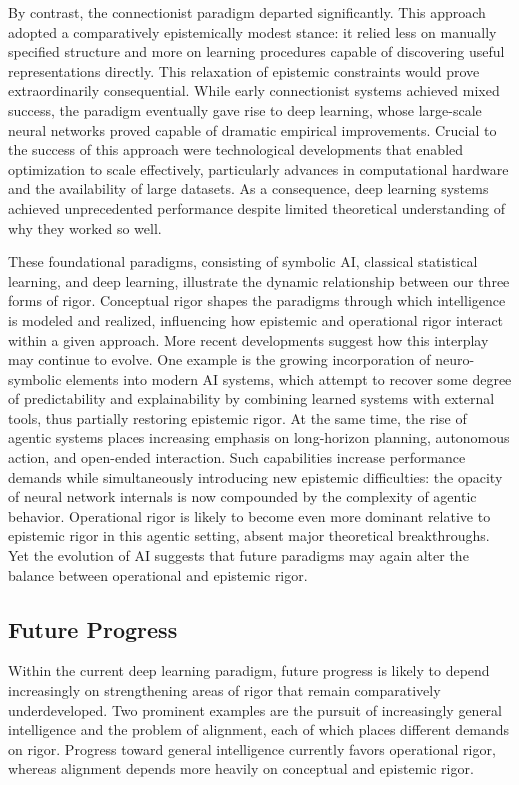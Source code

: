 \documentclass{article}
\begin{document}
By contrast, the connectionist paradigm departed significantly.
This approach adopted a comparatively epistemically modest stance: it relied less on manually specified structure and more on learning procedures capable of discovering useful representations directly.
This relaxation of epistemic constraints would prove extraordinarily consequential. While early connectionist systems achieved mixed success, the paradigm eventually gave rise to deep learning, whose large-scale neural networks proved capable of dramatic empirical improvements.
Crucial to the success of this approach were technological developments that enabled optimization to scale effectively, particularly advances in computational hardware and the availability of large datasets.
As a consequence, deep learning systems achieved unprecedented performance despite limited theoretical understanding of why they worked so well.

These foundational paradigms, consisting of symbolic AI, classical statistical learning, and deep learning, illustrate the dynamic relationship between our three forms of rigor.
Conceptual rigor shapes the paradigms through which intelligence is modeled and realized, influencing how epistemic and operational rigor interact within a given approach.
More recent developments suggest how this interplay may continue to evolve.
One example is the growing incorporation of neuro-symbolic elements into modern AI systems, which attempt to recover some degree of predictability and explainability by combining learned systems with external tools, thus partially restoring epistemic rigor.
At the same time, the rise of agentic systems places increasing emphasis on long-horizon planning, autonomous action, and open-ended interaction.
Such capabilities increase performance demands while simultaneously introducing new epistemic difficulties: the opacity of neural network internals is now compounded by the complexity of agentic behavior.
Operational rigor is likely to become even more dominant relative to epistemic rigor in this agentic setting, absent major theoretical breakthroughs.
Yet the evolution of AI suggests that future paradigms may again alter the balance between operational and epistemic rigor.

\subsection{Future Progress}

Within the current deep learning paradigm, future progress is likely to depend increasingly on strengthening areas of rigor that remain comparatively underdeveloped.
Two prominent examples are the pursuit of increasingly general intelligence and the problem of alignment, each of which places different demands on rigor.
Progress toward general intelligence currently favors operational rigor, whereas alignment depends more heavily on conceptual and epistemic rigor.
\end{document}
